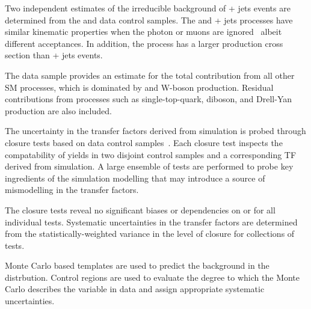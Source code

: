 Two independent estimates of the irreducible background of \znunu +
jets events are determined from the \gj and \mmj data control samples.
The \gj and \zmumu + jets processes have similar kinematic properties
when the photon or muons are ignored~\cite{Bern:2011pa} albeit
different acceptances. In addition, the \gj process has a larger
production cross section than \znunu + jets events.

The \mj data sample provides an estimate for the total
contribution from all other SM processes, which is dominated by \ttbar
and W-boson production. Residual contributions from processes such as
single-top-quark, diboson, and Drell-Yan production are also included.

The uncertainty in the transfer factors derived from simulation is
probed through closure tests based on data control
samples~\cite{RA1Paper2012}. Each closure test inspects the
compatability of yields in two disjoint control samples and a corresponding TF
derived from simulation. A large ensemble of tests are performed to
probe key ingredients of the simulation modelling that may introduce a
source of mismodelling in the transfer factors.

The closure tests reveal no significant biases or dependencies on
\njet or \scalht for all individual tests. Systematic uncertainties in
the transfer factors are determined from the statistically-weighted
variance in the level of closure for collections of
tests.

Monte Carlo based templates are used to predict the background in the \mht distrbution. Control regions are used to evaluate the degree to which the Monte Carlo describes the variable in data and assign appropriate systematic uncertainties.


